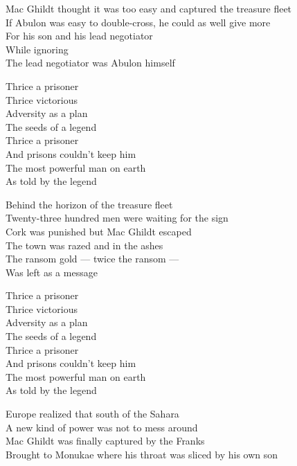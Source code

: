 \begin{lyrics}
Mac Ghildt thought it was too easy and captured the treasure fleet\\
If Abulon was easy to double-cross, he could as well give more\\
For his son and his lead negotiator\\
While ignoring\\
The lead negotiator was Abulon himself

Thrice a prisoner\\
Thrice victorious\\
Adversity as a plan\\
The seeds of a legend\\
Thrice a prisoner\\
And prisons couldn’t keep him\\
The most powerful man on earth\\
As told by the legend

Behind the horizon of the treasure fleet\\
Twenty-three hundred men were waiting for the sign\\
Cork was punished but Mac Ghildt escaped\\
The town was razed and in the ashes\\
The ransom gold — twice the ransom —\\
Was left as a message

Thrice a prisoner\\
Thrice victorious\\
Adversity as a plan\\
The seeds of a legend\\
Thrice a prisoner\\
And prisons couldn’t keep him\\
The most powerful man on earth\\
As told by the legend

Europe realized that south of the Sahara\\
A new kind of power was not to mess around\\
Mac Ghildt was finally captured by the Franks\\
Brought to Monukae where his throat was sliced by his own son
\end{lyrics}

